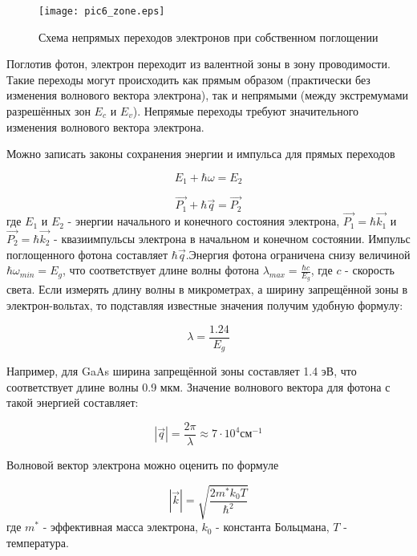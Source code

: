 \begin{figure}[h!]\centering
\texttt{[image: pic6\_zone.eps]}
\caption{Схема непрямых переходов электронов при собственном поглощении}
\label{pic6_zone}
\end{figure}

Поглотив фотон, электрон переходит из валентной зоны в зону проводимости. Такие переходы могут происходить как прямым образом (практически без изменения волнового вектора электрона), так и непрямыми (между экстремумами разрешённых зон $E_{c}$ и $E_{v}$). Непрямые переходы требуют значительного изменения волнового вектора электрона.

Можно записать законы сохранения энергии и импульса для прямых переходов

\begin{equation}
E_{1} + \hbar \omega = E_{2}
\end{equation}

\begin{equation}
\overrightarrow{P_{1}} + \hbar \overrightarrow{q} = \overrightarrow{P_{2}}
\end{equation}
где $E_{1}$ и $E_{2}$ - энергии начального и конечного состояния электрона, $\overrightarrow{P_{1}} = \hbar \overrightarrow{k_{1}}$ и $\overrightarrow{P_{2}} = \hbar \overrightarrow{k_{2}}$ - квазиимпульсы электрона в начальном и конечном состоянии. Импульс поглощенного фотона составляет $\hbar \overrightarrow{q}$.Энергия фотона ограничена снизу величиной $\hbar \omega_{min} = E_{g}$, что соответствует длине волны фотона $\lambda_{max} = \frac{\hbar c}{E_{g}}$, где $c$ - скорость света. Если измерять длину волны в микрометрах, а ширину запрещённой зоны в электрон-вольтах, то подставляя известные значения получим удобную формулу:

\begin{equation}
\lambda = \frac{1.24}{E_{g}}
\end{equation}

Например, для GaAs ширина запрещённой зоны составляет 1.4 эВ, что соответствует длине волны 0.9 мкм. Значение волнового вектора для фотона с такой энергией составляет:

\begin{equation}
|\overrightarrow{q}| = \frac{2 \pi}{\lambda} \approx 7 \cdot 10^{4}  \text{см}^{-1}
\end{equation}

Волновой вектор электрона можно оценить по формуле

\begin{equation}
|\overrightarrow{k}| = \sqrt{\frac{2 m^{*} k_{0} T}{\hbar^{2}}}
\end{equation}
где $m^{*}$ - эффективная масса электрона, $k_{0}$ - константа Больцмана, $T$ - температура.

